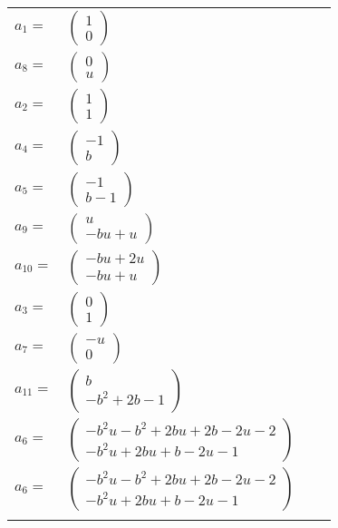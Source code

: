 \documentclass[1p]{elsarticle_modified}
\theoremstyle{definition}
\begin{document}
\begin{tabular}{m{7pt} m{180pt} m{7pt} m{180pt} }
\flushright $a_{1}=$&$\begin{pmatrix}1\\0\end{pmatrix}$ \\
\flushright $a_{8}=$&$\begin{pmatrix}0\\u\end{pmatrix}$ \\
\flushright $a_{2}=$&$\begin{pmatrix}1\\1\end{pmatrix}$ \\
\flushright $a_{4}=$&$\begin{pmatrix}-1\\b\end{pmatrix}$ \\
\flushright $a_{5}=$&$\begin{pmatrix}-1\\b-1\end{pmatrix}$ \\
\flushright $a_{9}=$&$\begin{pmatrix}u\\- b u+u\end{pmatrix}$ \\
\flushright $a_{10}=$&$\begin{pmatrix}- b u+2 u\\- b u+u\end{pmatrix}$ \\
\flushright $a_{3}=$&$\begin{pmatrix}0\\1\end{pmatrix}$ \\
\flushright $a_{7}=$&$\begin{pmatrix}- u\\0\end{pmatrix}$ \\
\flushright $a_{11}=$&$\begin{pmatrix}b\\- b^2+2 b-1\end{pmatrix}$ \\
\flushright $a_{6}=$&$\begin{pmatrix}- b^2 u- b^2+2 b u+2 b-2 u-2\\- b^2 u+2 b u+b-2 u-1\end{pmatrix}$\\ \flushright $a_{6}=$&$\begin{pmatrix}- b^2 u- b^2+2 b u+2 b-2 u-2\\- b^2 u+2 b u+b-2 u-1\end{pmatrix}$\\&\end{tabular}
\end{document}
